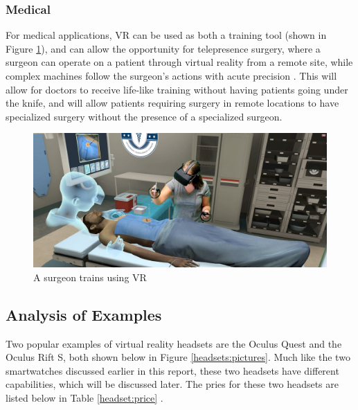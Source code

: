 \subsubsection{Medical}
For medical applications, VR can be used as both a training tool (shown in
Figure \ref{vr:med_train}), and can allow the opportunity for telepresence 
surgery, where a surgeon can operate on a patient through virtual reality 
from a remote site, while complex machines follow the surgeon's actions 
with acute precision \cite{vr_med_app}. This will allow for doctors to receive
life-like training without having patients going under the knife, and will allow
patients requiring surgery in remote locations to have specialized surgery without the
presence of a specialized surgeon.

\begin{figure}[h!]
    \centering
    \includegraphics[width=.6\linewidth]{media/med_training_vr.jpg}
    \caption{A surgeon trains using VR \cite{med_train_vr}}
    \label{vr:med_train}
\end{figure}

\subsection{Analysis of Examples}
Two popular examples of virtual reality headsets are the Oculus Quest and the Oculus
Rift S, both shown below in Figure \ref{headsets:pictures}. Much like the two
smartwatches discussed earlier in this report, these two headsets have different
capabilities, which will be discussed later. The pries for these two headsets are listed
below in Table \ref{headset:price} \cite{quest_price} \cite{rift_price}.

